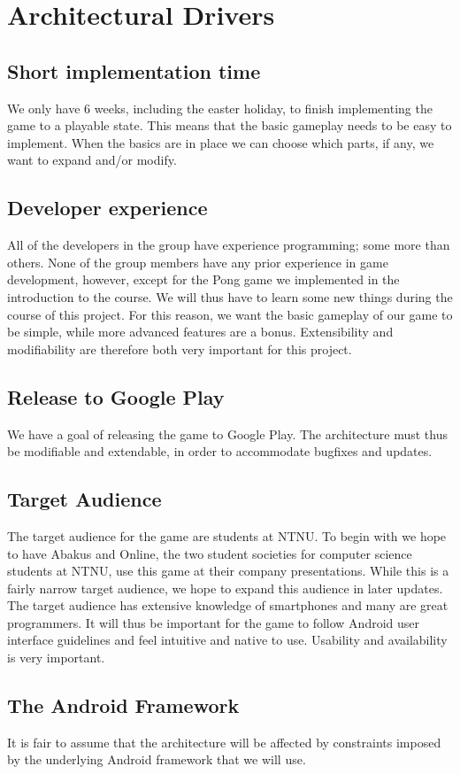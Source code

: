\section{Architectural Drivers}
\label{sec:architecturaldrivers}

\subsection{Short implementation time}
We only have 6 weeks, including the easter holiday, to finish implementing the
game to a playable state. This means that the basic gameplay needs to be easy
to implement. When the basics are in place we can choose which parts, if any,
we want to expand and/or modify.

\subsection{Developer experience}
All of the developers in the group have experience programming; some more than
others. None of the group members have any prior experience in game
development, however, except for the Pong game we implemented in the
introduction to the course. We will thus have to learn some new things during
the course of this project. For this reason, we want the basic gameplay of our
game to be simple, while more advanced features are a bonus. Extensibility and
modifiability are therefore both very important for this project.

\subsection{Release to Google Play}
We have a goal of releasing the game to Google Play. The architecture must thus
be modifiable and extendable, in order to accommodate bugfixes and updates.

\subsection{Target Audience}
The target audience for the game are students at NTNU\@. To begin with we hope
to have Abakus and Online, the two student societies for computer science
students at NTNU, use this game at their company presentations. While this is a
fairly narrow target audience, we hope to expand this audience in later updates.
The target audience has extensive knowledge of smartphones and many are great
programmers. It will thus be important for the game to follow Android user
interface guidelines and feel intuitive and native to use. Usability and
availability is very important.

\subsection{The Android Framework}
It is fair to assume that the architecture will be affected by constraints
imposed by the underlying Android framework that we will use.
